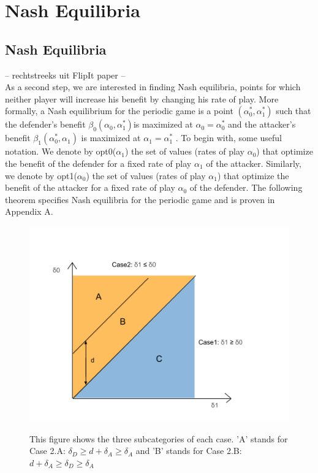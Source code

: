 \chapter{Nash Equilibria}
\label{chapter:Nash}
%


\section{Nash Equilibria}
-- rechtstreeks uit FlipIt paper --\\
As a second step, we are interested in finding Nash equilibria, points
for which neither player will increase his benefit by changing his rate of play. More
formally, a Nash equilibrium for the periodic game is a point $(\alpha_{0}^{*},\alpha_{1}^{*})$ such that
the defender's benefit $\beta_{0}(\alpha_{0},\alpha_{1}^{*}) $is maximized at $\alpha_{0}= \alpha_{0}^{*}$ and the attacker's benefit
$\beta_{1}(\alpha_{0}^{*},\alpha_{1}) $ is maximized at $\alpha_{1}= \alpha_{1}^{*}$ .
To begin with, some useful notation. We denote by opt0($\alpha_{1}$) the set of values (rates
of play $\alpha_{0}$) that optimize the benefit of the defender for a fixed rate of play $\alpha_{1}$ of the
attacker. Similarly, we denote by opt1($\alpha_{0}$) the set of values (rates of play $\alpha_{1}$) that optimize
the benefit of the attacker for a fixed rate of play $\alpha_{0}$ of the defender. The following
theorem specifies Nash equilibria for the periodic game and is proven in Appendix A. \\
\begin{figure}[hbtp]
\caption{This figure shows the three subcategories of each case. 'A' stands for Case 2.A: $\delta_{D} \geq d+\delta_{A} \geq \delta_{A}$ and 'B' stands for Case 2.B: $d+\delta_{A} \geq \delta_{D} \geq  \delta_{A} $ }
\centering
\includegraphics[scale=0.4]{Images/bestresp.png}
\label{grafiekbestr}
\end{figure}

